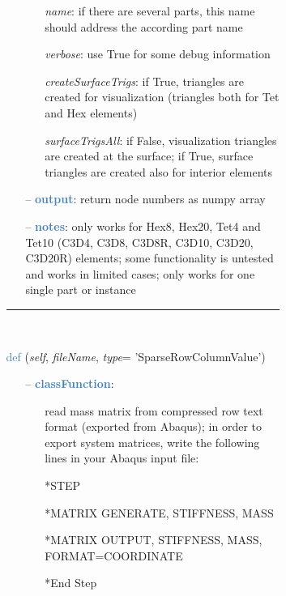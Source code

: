 \begin{itemize}[leftmargin=1.4cm]
\begin{itemize}[leftmargin=1.4cm]
\begin{itemize}[leftmargin=1.4cm]
\begin{itemize}[leftmargin=0.5cm]
\begin{itemize}[leftmargin=1.4cm]
\begin{itemize}[leftmargin=1.4cm]
\begin{itemize}[leftmargin=0.5cm]
\begin{itemize}[leftmargin=0.7cm]
\begin{itemize}[leftmargin=1.2cm]
\item[]{\it name}: if there are several parts, this name should address the according part name
\item[]{\it verbose}: use True for some debug information
\item[]{\it createSurfaceTrigs}: if True, triangles are created for visualization (triangles both for Tet and Hex elements)
\item[]{\it surfaceTrigsAll}: if False, visualization triangles are created at the surface; if True, surface triangles are created also for interior elements
\end{itemize}
\item[--]\textcolor{steelblue}{\bf output}: return node numbers as numpy array
\item[--]\textcolor{steelblue}{\bf notes}: only works for Hex8, Hex20, Tet4 and Tet10 (C3D4, C3D8, C3D8R, C3D10, C3D20, C3D20R) elements; some functionality is untested and works in limited cases; only works for one single part or instance
\vspace{12pt}\end{itemize}
%
\noindent\rule{8cm}{0.75pt}\vspace{1pt} \\ 
\begin{flushleft}
\noindent \textcolor{steelblue}{def {\bf {}}}\label{sec:FEM:FEMinterface:ReadMassMatrixFromAbaqus}
({\it self}, {\it fileName}, {\it type}= 'SparseRowColumnValue')
\end{flushleft}
\setlength{\itemindent}{0.7cm}
\begin{itemize}[leftmargin=0.7cm]
\item[--]\textcolor{steelblue}{\bf classFunction}: \vspace{-6pt}
\begin{itemize}[leftmargin=1.2cm]
\setlength{\itemindent}{-0.7cm}
\item[]read mass matrix from compressed row text format (exported from Abaqus); in order to export system matrices, write the following lines in your Abaqus input file:
\item[]*STEP
\item[]*MATRIX GENERATE, STIFFNESS, MASS
\item[]*MATRIX OUTPUT, STIFFNESS, MASS, FORMAT=COORDINATE
\item[]*End Step
\end{itemize}
\vspace{12pt}\end{itemize}

\end{itemize}
\end{itemize}
\end{itemize}
\end{itemize}
\end{itemize}
\end{itemize}
\end{itemize}
